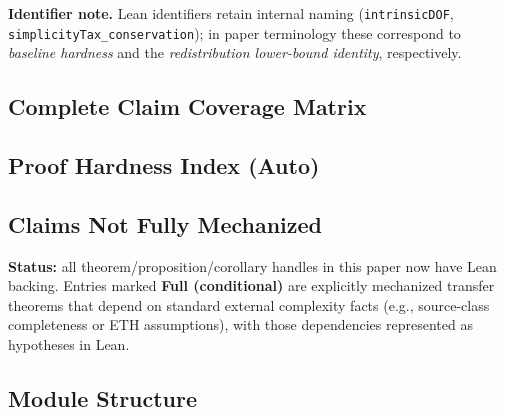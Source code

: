\noindent\textbf{Identifier note.}
Lean identifiers retain internal naming (\texttt{intrinsicDOF}, \texttt{simplicityTax\_conservation}); in paper terminology these correspond to \emph{baseline hardness} and the \emph{redistribution lower-bound identity}, respectively.

\subsection{Complete Claim Coverage Matrix}

\subsection{Proof Hardness Index (Auto)}

\subsection{Claims Not Fully Mechanized}

\textbf{Status:} all theorem/proposition/corollary handles in this paper now have Lean backing.
Entries marked \textbf{Full (conditional)} are explicitly mechanized transfer theorems that depend on standard external complexity facts (e.g., source-class completeness or ETH assumptions), with those dependencies represented as hypotheses in Lean.

\subsection{Module Structure}


